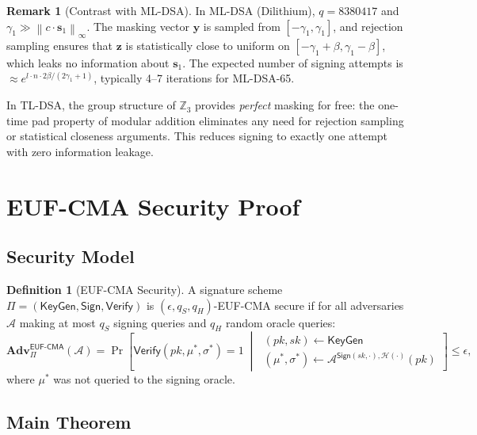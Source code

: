 \documentclass[11pt,a4paper]{article}
\theoremstyle{definition}
\newtheorem{definition}[theorem]{Definition}
\newtheorem{remark}[theorem]{Remark}
\newcommand{\Z}{\mathbb{Z}}
\newcommand{\linf}[1]{\left\lVert #1 \right\rVert_{\infty}}
\newcommand{\Adv}{\mathbf{Adv}}
\newcommand{\KeyGen}{\textsf{KeyGen}}
\newcommand{\Sign}{\textsf{Sign}}
\newcommand{\Verify}{\textsf{Verify}}
\newcommand{\EUFCMA}{\textsf{EUF-CMA}}
\begin{document}
\begin{remark}[Contrast with ML-DSA]
In ML-DSA (Dilithium), $q = 8380417$ and $\gamma_1 \gg \linf{c \cdot \mathbf{s}_1}$. The masking vector $\mathbf{y}$ is sampled from $[-\gamma_1, \gamma_1]$, and rejection sampling ensures that $\mathbf{z}$ is statistically close to uniform on $[-\gamma_1 + \beta, \gamma_1 - \beta]$, which leaks no information about $\mathbf{s}_1$. The expected number of signing attempts is $\approx e^{l \cdot n \cdot 2\beta / (2\gamma_1+1)}$, typically 4--7 iterations for ML-DSA-65.

In TL-DSA, the group structure of $\Z_3$ provides \emph{perfect} masking for free: the one-time pad property of modular addition eliminates any need for rejection sampling or statistical closeness arguments. This reduces signing to exactly one attempt with zero information leakage.
\end{remark}

\section{EUF-CMA Security Proof}
\label{sec:proof}

\subsection{Security Model}

\begin{definition}[EUF-CMA Security]
A signature scheme $\Pi = (\KeyGen, \Sign, \Verify)$ is $(\epsilon, q_S, q_H)$-EUF-CMA secure if for all adversaries $\mathcal{A}$ making at most $q_S$ signing queries and $q_H$ random oracle queries:
\[
  \Adv^{\EUFCMA}_\Pi(\mathcal{A}) = \Pr\left[
    \Verify(\textit{pk}, \mu^*, \sigma^*) = 1 \;\middle|\;
    \begin{array}{l}
      (\textit{pk}, \textit{sk}) \leftarrow \KeyGen \\
      (\mu^*, \sigma^*) \leftarrow \mathcal{A}^{\Sign(\textit{sk}, \cdot), \mathcal{H}(\cdot)}(\textit{pk})
    \end{array}
  \right] \leq \epsilon,
\]
where $\mu^*$ was not queried to the signing oracle.
\end{definition}

\subsection{Main Theorem}
\end{document}
